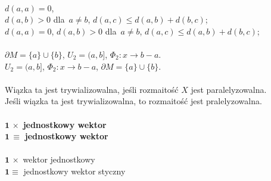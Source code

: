 \documentclass[a4paper,11pt]{article}
\begin{document}
\vspace{\spaceTwo}


\noindent
{} \\
\Jest  $d( a, a ) = 0$, \\[0.1em]
$d( a,b ) > 0$ dla~$a \neq b$, $d( a, c ) \leq d( a, b ) + d( b,c )$; \\[0.3em]
\Powin $d( a, a ) = 0$, $d( a,b ) > 0$ dla~$a \neq b$,
$d( a, c ) \leq d( a, b ) + d( b,c )$; \\[0.3em]
 \\[0.3em]
\Jest  $\partial M = \{ a \} \cup \{ b \}$, $U_{ 2 } = ( a, b ]$,
$\Phi_{ 2 } : x \rightarrow b - a$. \\[0.3em]
\Powin $U_{ 2 } = ( a, b ]$, $\Phi_{ 2 } : x \rightarrow b - a$,
$\partial M = \{ a \} \cup \{ b \}$. \\[0.3em]
 \\
\Jest  Wiązka ta jest trywializowalna, jeśli rozmaitość $X$ jest
paralelyzowalna. \\
\Powin Jeśli wiązka ta jest trywializowalna, to rozmaitość jest
pralelyzowalna. \\
 \\
\Jest  $\mathbf{ 1 } \, \times$ \textbf{jednostkowy wektor} \\
\Powin $\mathbf{ 1 } \, \equiv$ \textbf{jednostkowy wektor} \\
 \\
\Jest  $\mathbf{ 1 } \, \times$ wektor jednostkowy \\
\Powin $\mathbf{ 1 } \equiv$ jednostkowy wektor styczny \\
















\newpage


\vspace{0em}
\end{document}

